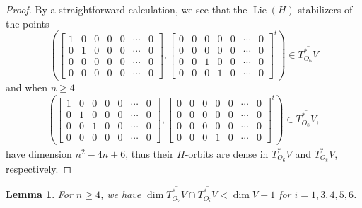 \documentclass[11pt,reqno]{amsart}
\newcommand{\ol}[1]{\overline{#1}}
\newcommand{\op}[1]{\operatorname{#1}}
\newtheorem{lemma}[theorem]{Lemma}
\numberwithin{equation}{section}
\begin{document}
\begin{proof}
By a straightforward calculation, we see that the $\op{Lie}(H)$-stabilizers of the points 
\[\left(\begin{bmatrix} 1 & 0 & 0 & 0 & 0 &\cdots & 0 \\ 0 & 1 & 0 & 0 & 0 &\cdots & 0 \\ 0& 0 & 0 & 0 & 0 &\cdots & 0 \\ 0 & 0 & 0 & 0 & 0 &\cdots & 0 \end{bmatrix}, \begin{bmatrix} 0 & 0 & 0 & 0 & 0 &\cdots & 0 \\ 0 & 0 & 0 & 0 & 0 &\cdots & 0 \\ 0 & 0 & 1 & 0 & 0 &\cdots & 0 \\ 0 & 0 & 0 & 1 & 0 &\cdots & 0  \end{bmatrix}^t\right) \in \ol{T_{O_6}^* V}\] and when $n\geq 4$
\[\left(\begin{bmatrix} 1 & 0 & 0 & 0 & 0 &\cdots & 0\\ 0 & 1 & 0 & 0 & 0 &\cdots & 0 \\ 0& 0 & 1 & 0 & 0 &\cdots & 0 \\ 0 & 0 & 0 & 0 & 0 &\cdots & 0 \end{bmatrix}, \begin{bmatrix} 0 & 0 & 0 & 0 & 0 &\cdots & 0 \\ 0 & 0 & 0 & 0 & 0 &\cdots & 0 \\ 0 & 0 & 0 & 0 & 0 &\cdots & 0 \\ 0 & 0 & 0 & 1 & 0 &\cdots & 0 \end{bmatrix}^t\right) \in \ol{T_{O_8}^* V},\] have dimension $n^2-4n+6$, thus their $H$-orbits are dense in $\ol{T_{O_6}^* V}$ and $\ol{T_{O_8}^* V}$, respectively.
\end{proof}

\begin{lemma}\label{lem:codim1}
For $n\geq 4$, we have $\dim \ol{T_{O_7}^* V} \cap \ol{T_{O_i}^* V} < \dim V - 1$ for $i=1,3,4,5,6$.
\end{lemma}
\end{document}
